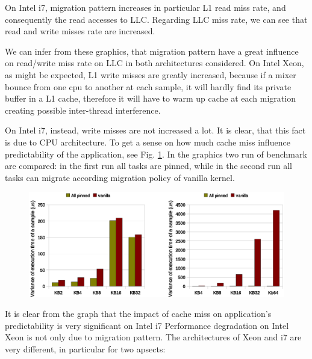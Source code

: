 On Intel i7, migration pattern increases in particular L1 read miss rate, and consequently the read accesses to LLC. Regarding LLC 
miss rate, we can see that read and write misses rate are increased.

We can infer from these graphics, that migration pattern have a great influence on read/write miss rate on LLC in both architectures considered. On Intel 
Xeon, as might be expected, L1 write misses are greatly increased, because if a mixer bounce from one cpu to another at each sample, it will hardly 
find its private buffer in a L1 cache, therefore it will have to warm up cache at each migration creating possible inter-thread interference.

On Intel i7, instead, write misses are not increased a lot. It is clear, that this fact is due to CPU architecture. To get a sense on how much cache miss 
influence predictability of the application, see Fig. \ref{fig:time_cpf_var_Xeon_i7}. In the graphics two run of benchmark are compared: in the first run 
all tasks are pinned, while in the second run all tasks can migrate according migration policy of vanilla kernel.

\newpage
\begin{figure}[htbp]
\centering
\includegraphics[width=\widefigure]{images/cpf_time/time_cpf_var_Xeon_i7.eps}
\caption{}
\label{fig:time_cpf_var_Xeon_i7}
\end{figure}

It is clear from the graph that the impact of cache miss on application's predictability is very significant on Intel i7
Performance degradation on Intel Xeon is not only due to migration pattern. The architectures of Xeon and i7 are very different, in particular for two 
apsects:

